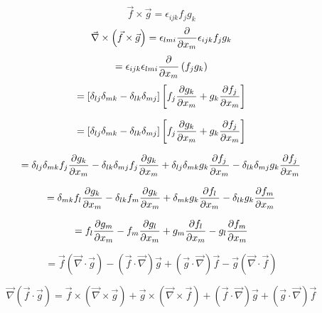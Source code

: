 \begin{solution}[print]
$$ \vec{f} \times \vec{g} = \epsilon_{ijk} f_j g_k $$
$$ \vec{\nabla} \times \left( \vec{f} \times \vec{g} \right) = \epsilon_{lmi} {\partial \over \partial x_m} \epsilon_{ijk} f_j g_k $$
$$ = \epsilon_{ijk} \epsilon_{lmi} {\partial \over \partial x_m} \left( f_j g_k \right) $$
$$ = \left[ \delta_{lj} \delta_{mk} - \delta_{lk} \delta_{mj} \right] \left[ f_j {\partial g_k \over \partial x_m} + g_k {\partial f_j \over \partial x_m} \right] $$

$$ = \left[ \delta_{lj} \delta_{mk} - \delta_{lk} \delta_{mj} \right] \left[ f_j {\partial g_k \over \partial x_m} + g_k {\partial f_j \over \partial x_m} \right] $$

$$ = \delta_{lj} \delta_{mk} f_j {\partial g_k \over \partial x_m} - 
\delta_{lk} \delta_{mj} f_j {\partial g_k \over \partial x_m} + 
\delta_{lj} \delta_{mk} g_k {\partial f_j \over \partial x_m} - 
\delta_{lk} \delta_{mj} g_k {\partial f_j \over \partial x_m}  $$

$$ = \delta_{mk} f_l {\partial g_k \over \partial x_m} - 
\delta_{lk} f_m {\partial g_k \over \partial x_m} + 
\delta_{mk} g_k {\partial f_l \over \partial x_m} - 
\delta_{lk} g_k {\partial f_m \over \partial x_m}  $$

$$ = f_l {\partial g_m \over \partial x_m} - 
 f_m {\partial g_l \over \partial x_m} + 
 g_m {\partial f_l \over \partial x_m} - 
g_l {\partial f_m \over \partial x_m}  $$

$$ = \vec{f} \left( \vec{\nabla} \cdot \vec{g} \right) -
\left( \vec{f} \cdot \vec{\nabla} \right) \vec{g} +
\left( \vec{g} \cdot \vec{\nabla} \right) \vec{f} -
\vec{g} \left( \vec{\nabla} \cdot \vec{f} \right) $$
\end{solution}


\begin{question}
$$\vec{\nabla} \left( \vec{f} \cdot \vec{g} \right) = \vec{f} \times \left( \vec{\nabla} \times \vec{g} \right) + \vec{g} \times \left( \vec{\nabla} \times\vec{f} \right) + \left( \vec{f} \cdot \vec{\nabla} \right) \vec{g} + \left( \vec{g} \cdot \vec{\nabla} \right) \vec{f} $$
\end{question}

